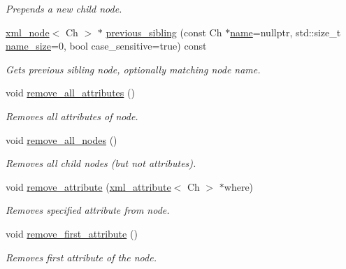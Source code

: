 \begin{DoxyCompactItemize}
\begin{DoxyCompactList}\small\item\em Prepends a new child node. \end{DoxyCompactList}\item 
\mbox{\hyperlink{classrapidxml_1_1xml__node}{xml\+\_\+node}}$<$ Ch $>$ $\ast$ \mbox{\hyperlink{classrapidxml_1_1xml__node_a5fd85382924d5c9bd6dc375855db5344}{previous\+\_\+sibling}} (const Ch $\ast$\mbox{\hyperlink{classrapidxml_1_1xml__base_af8436e9ee14c127220113eaa956eafee}{name}}=nullptr, std\+::size\+\_\+t \mbox{\hyperlink{classrapidxml_1_1xml__base_ad01e2eff02202b130baad012d1ed7328}{name\+\_\+size}}=0, bool case\+\_\+sensitive=true) const
\begin{DoxyCompactList}\small\item\em Gets previous sibling node, optionally matching node name. \end{DoxyCompactList}\item 
void \mbox{\hyperlink{classrapidxml_1_1xml__node_a59e6ad4cfd5e8096c052e71d79561eda}{remove\+\_\+all\+\_\+attributes}} ()
\begin{DoxyCompactList}\small\item\em Removes all attributes of node. \end{DoxyCompactList}\item 
void \mbox{\hyperlink{classrapidxml_1_1xml__node_a0218147d13e41d5fa60ced4e7a7e9726}{remove\+\_\+all\+\_\+nodes}} ()
\begin{DoxyCompactList}\small\item\em Removes all child nodes (but not attributes). \end{DoxyCompactList}\item 
void \mbox{\hyperlink{classrapidxml_1_1xml__node_ac75154db2e768c0e5b541fc8cd0775ab}{remove\+\_\+attribute}} (\mbox{\hyperlink{classrapidxml_1_1xml__attribute}{xml\+\_\+attribute}}$<$ Ch $>$ $\ast$where)
\begin{DoxyCompactList}\small\item\em Removes specified attribute from node. \end{DoxyCompactList}\item 
void \mbox{\hyperlink{classrapidxml_1_1xml__node_a4eea4a7f6cb484ca9944f7eafe6e1843}{remove\+\_\+first\+\_\+attribute}} ()
\begin{DoxyCompactList}\small\item\em Removes first attribute of the node. \end{DoxyCompactList}\item 

\end{DoxyCompactItemize}
